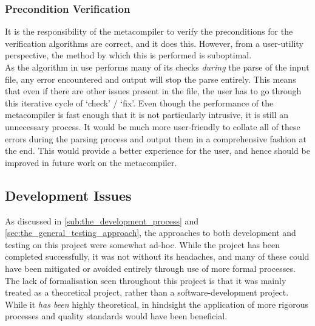 
\subsubsection{Precondition Verification} %
\label{ssub:precondition_verification}
It is the responsibility of the metacompiler to verify the preconditions for the verification algorithms are correct, and it does this.
However, from a user-utility perspective, the method by which this is performed is suboptimal.\\

As the algorithm in use performs many of its checks \textit{during} the parse of the input file, any error encountered and output will stop the parse entirely.
This means that even if there are other issues present in the file, the user has to go through this iterative cycle of `check' / `fix'.
Even though the performance of the metacompiler is fast enough that it is not particularly intrusive, it is still an unnecessary process. 
It would be much more user-friendly to collate all of these errors during the parsing process and output them in a comprehensive fashion at the end.
This would provide a better experience for the user, and hence should be improved in future work on the metacompiler. 



\subsection{Development Issues} %
\label{sub:development_issues}
As discussed in \autoref{sub:the_development_process} and \autoref{sec:the_general_testing_approach}, the approaches to both development and testing on this project were somewhat ad-hoc. 
While the project has been completed successfully, it was not without its headaches, and many of these could have been mitigated or avoided entirely through use of more formal processes.
The lack of formalisation seen throughout this project is that it was mainly treated as a theoretical project, rather than a software-development project.
While it \textit{has been} highly theoretical, in hindsight the application of more rigorous processes and quality standards would have been beneficial.\\

